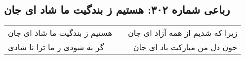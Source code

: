 \begin{center}
\section*{رباعی شماره ۳۰۲: هستیم ز بندگیت ما شاد ای جان}
\label{sec:sh302}
\begin{longtable}{l p{0.5cm} r}
هستیم ز بندگیت ما شاد ای جان
&&
زیرا که شدیم از همه آزاد ای جان
\\
گر به شودی ز ما ترا نا شادی
&&
خون دل من مبارکت باد ای جان
\\
\end{longtable}
\end{center}
